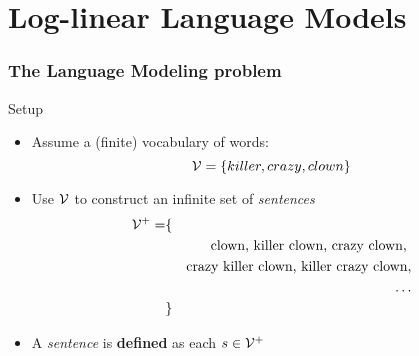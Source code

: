 



\section{Log-linear Language Models}

\begin{frame}
\frametitle{The Language Modeling problem}
\begin{block}{Setup}
\begin{itemize}[<+->]
\item Assume a (finite) vocabulary of words:
\[ {\cal V} = \{ killer, crazy, clown \} \]
\item Use ${\cal V}$ to construct an infinite set of \textit{sentences} 
\begin{eqnarray*} 
{\cal V}^+ = & \{ & \\
&& \mbox{clown, killer clown, crazy clown, } \\
&& \mbox{crazy killer clown, killer crazy clown}, \\
&& \ldots \\
& \} &
\end{eqnarray*}
\item A \textit{sentence} is \textbf{defined} as each $s \in {\cal V}^+$
\end{itemize}
\end{block}
\end{frame}




